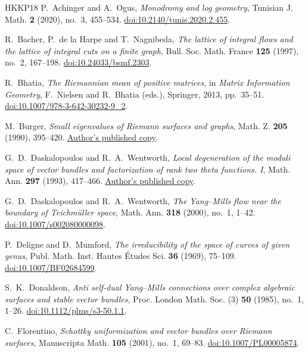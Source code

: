 \begin{thebibliography}{HKKP18}
P.~Achinger and A.~Ogus, \emph{Monodromy and log geometry},
Tunisian J. Math. \textbf{2} (2020), no.~3, 455--534.
\href{https://doi.org/10.2140/tunis.2020.2.455}{doi:10.2140/tunis.2020.2.455}.

R.~Bacher, P.~de la Harpe and T.~Nagnibeda,
\emph{The lattice of integral flows and the lattice of integral cuts on a finite graph},
Bull. Soc. Math. France \textbf{125} (1997), no.~2, 167--198.
\href{https://doi.org/10.24033/bsmf.2303}{doi:10.24033/bsmf.2303}.

R.~Bhatia, \emph{The Riemannian mean of positive matrices}, in
\emph{Matrix Information Geometry}, F.~Nielsen and R.~Bhatia (eds.),
Springer, 2013, pp.~35--51.
\href{https://doi.org/10.1007/978-3-642-30232-9_2}{doi:10.1007/978-3-642-30232-9\_2}.

M.~Burger, \emph{Small eigenvalues of Riemann surfaces and graphs},
Math. Z. \textbf{205} (1990), 395--420.
\href{https://people.math.ethz.ch/~burger/pub/1990_Small_eigenvalues.pdf}{Author's published copy}.

G.~D.~Daskalopoulos and R.~A.~Wentworth,
\emph{Local degeneration of the moduli space of vector bundles and factorization of rank two theta functions. I},
Math. Ann. \textbf{297} (1993), 417--466.
\href{https://math.umd.edu/~raw/papers/local.pdf}{Author's published copy}.

G.~D.~Daskalopoulos and R.~A.~Wentworth,
\emph{The Yang--Mills flow near the boundary of Teichm\"uller space},
Math. Ann. \textbf{318} (2000), no.~1, 1--42.
\href{https://doi.org/10.1007/s002080000098}{doi:10.1007/s002080000098}.

P.~Deligne and D.~Mumford,
\emph{The irreducibility of the space of curves of given genus},
Publ. Math. Inst. Hautes Études Sci. \textbf{36} (1969), 75--109.
\href{https://doi.org/10.1007/BF02684599}{doi:10.1007/BF02684599}.

S.~K.~Donaldson,
\emph{Anti self-dual Yang--Mills connections over complex algebraic surfaces and stable vector bundles},
Proc. London Math. Soc. (3) \textbf{50} (1985), no.~1, 1--26.
\href{https://doi.org/10.1112/plms/s3-50.1.1}{doi:10.1112/plms/s3-50.1.1}.

C.~Florentino,
\emph{Schottky uniformization and vector bundles over Riemann surfaces},
Manuscripta Math. \textbf{105} (2001), no.~1, 69--83.
\href{https://doi.org/10.1007/PL00005874}{doi:10.1007/PL00005874}.


\end{thebibliography}
